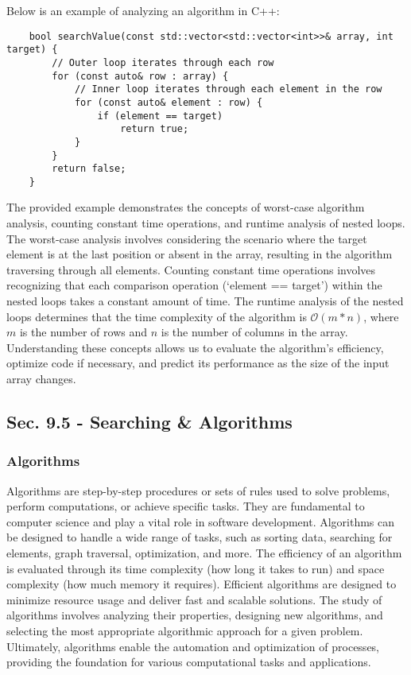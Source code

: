 \begin{solution}
    Below is an example of analyzing an algorithm in C++: 

    \horizontalline

    \begin{verbatim}
    bool searchValue(const std::vector<std::vector<int>>& array, int target) {
        // Outer loop iterates through each row
        for (const auto& row : array) {         
            // Inner loop iterates through each element in the row
            for (const auto& element : row) {     
                if (element == target)
                    return true;
            }
        }
        return false;
    }
    \end{verbatim}

    \horizontalline

    The provided example demonstrates the concepts of worst-case algorithm analysis, counting constant time operations, and runtime analysis of nested loops. The worst-case analysis involves considering the scenario where the target element is at the last position or absent in the array, resulting in the algorithm traversing through all elements. Counting constant time operations involves recognizing that each comparison operation 
    (`element == target') within the nested loops takes a constant amount of time. The runtime analysis of the nested loops determines that the time complexity of the algorithm is $\mathcal{O}(m*n)$, where $m$ is the number of rows and $n$ is the number of columns in the array. Understanding these concepts allows us to evaluate the algorithm's efficiency, optimize code if necessary, and predict its performance as the size of the input array changes.
\end{solution}

\subsection*{Sec. 9.5 - Searching \& Algorithms}

\subsubsection{Algorithms}

Algorithms are step-by-step procedures or sets of rules used to solve problems, perform computations, or achieve specific tasks. They are fundamental to computer science and play a vital role in software development. Algorithms can be designed to handle a wide range of tasks, such as sorting data, searching for elements, graph traversal, optimization, and more. The efficiency of an algorithm is evaluated through its time complexity (how long it takes to run) 
and space complexity (how much memory it requires). Efficient algorithms are designed to minimize resource usage and deliver fast and scalable solutions. The study of algorithms involves analyzing their properties, designing new algorithms, and selecting the most appropriate algorithmic approach for a given problem. Ultimately, algorithms enable the automation and optimization of processes, providing the foundation for various computational tasks and applications.

